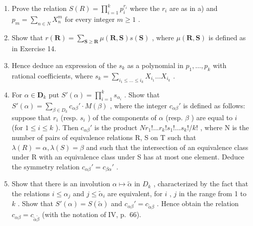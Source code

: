 \begin{enumerate}
\def\labelenumi{\alph{enumi})}
\setcounter{enumi}{1}
\item
  Prove the relation \(S(R) = \prod_{i=1}^{k} p_i^{r_i}\) where the \(r_i\) are as in a) and \(p_m = \sum_{n \in N} X_n^m\) for every integer \(m \geqslant 1\) .
\item
  Show that \(r(\mathbf{R}) = \sum_{\mathbf{S} \geqslant \mathbf{R}} \mu(\mathbf{R}, \mathbf{S}) s(\mathbf{S})\) , where \(\mu(\mathbf{R}, \mathbf{S})\) is defined as in Exercise 14.
\item
  Hence deduce an expression of the \(s_k\) as a polynomial in \(p_1, \ldots, p_k\) with rational coefficients, where \(s_k = \sum_{i_1 \leq \ldots \leq i_k} X_{i_1} \ldots X_{i_k}\) .
\item
  For \(\alpha \in \mathbf{D}_k\) put \(S'(\alpha) = \prod_{i=1}^{k} s_{\alpha_i}\) . Show that \(S'(\alpha) = \sum_{\beta \in D_k} c_{\alpha\beta}' \cdot M(\beta)\) , where the integer \(c_{\alpha\beta}'\) is defined as follows: suppose that \(r_i\) (resp. \(s_i\) ) of the components of \(\alpha\) (resp. \(\beta\) ) are equal to \(i\) (for \(1 \leqslant i \leqslant k\) ). Then \(c_{\alpha\beta}'\) is the product \(Nr_1!... r_k!s_1!... s_k!/k!\) , where N is the number of pairs of equivalence relations R, S on T such that \(\lambda(R) = \alpha, \lambda(S) = \beta\) and such that the intersection of an equivalence class under R with an equivalence class under S has at most one element. Deduce the symmetry relation \(c_{\alpha\beta}' = c_{\beta\alpha}'\) .
\item
  Show that there is an involution \(\alpha \mapsto \tilde{\alpha}\) in \(D_k\) , characterized by the fact that the relations \(i \leqslant \alpha_j\) and \(j \leqslant \tilde{\alpha}_i\) are equivalent, for \(i\) , \(j\) in the range from 1 to \(k\) . Show that \(S'(\alpha) = S(\tilde{\alpha})\) and \(c_{\alpha\beta}' = c_{\tilde{\alpha}\beta}\) . Hence obtain the relation \(c_{\alpha\beta} = c_{\tilde{\alpha}\tilde{\beta}}\) (with the notation of IV, p.~66).
\end{enumerate}

